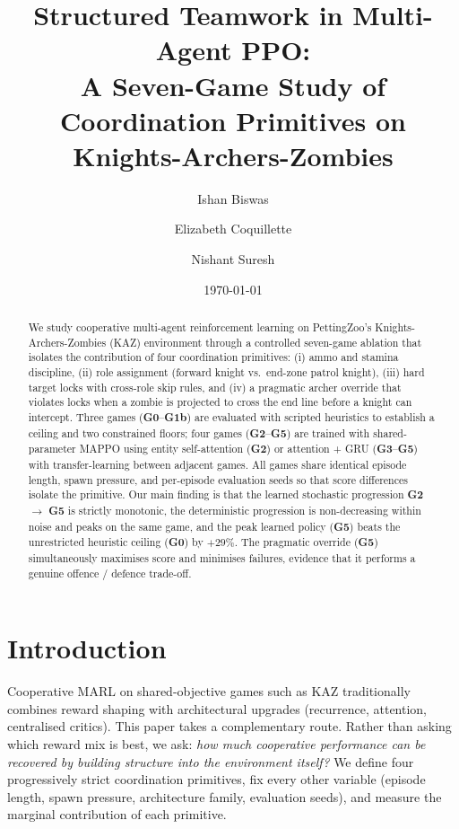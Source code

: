 \documentclass[11pt,a4paper]{article}
\newcommand{\gz}{\textbf{G0}}
\newcommand{\gb}{\textbf{G1b}}
\newcommand{\gii}{\textbf{G2}}
\newcommand{\giii}{\textbf{G3}}
\newcommand{\gv}{\textbf{G5}}
\begin{document}
\title{\textbf{Structured Teamwork in Multi-Agent PPO:\\
A Seven-Game Study of Coordination Primitives on Knights-Archers-Zombies}}
\author[1]{Ishan Biswas \and Elizabeth Coquillette \and Nishant Suresh}
\date{\today}
\maketitle

\begin{abstract}
We study cooperative multi-agent reinforcement learning on PettingZoo's
Knights-Archers-Zombies (KAZ) environment through a controlled
seven-game ablation that isolates the contribution of four coordination
primitives: (i) ammo and stamina discipline, (ii) role assignment
(forward knight vs.\ end-zone patrol knight), (iii) hard target locks
with cross-role skip rules, and (iv) a pragmatic archer override that
violates locks when a zombie is projected to cross the end line before a
knight can intercept. Three games (\gz--\gb{}) are evaluated with
scripted heuristics to establish a ceiling and two constrained floors;
four games (\gii--\gv{}) are trained with shared-parameter MAPPO using
entity self-attention (\gii{}) or attention + GRU (\giii--\gv{}) with
transfer-learning between adjacent games. All games share identical
episode length, spawn pressure, and per-episode evaluation seeds so that
score differences isolate the primitive. Our main finding is that the
learned stochastic progression \gii{} $\to$ \gv{} is strictly monotonic,
the deterministic progression is non-decreasing within noise and peaks
on the same game, and the peak learned policy (\gv{}) beats the
unrestricted heuristic ceiling (\gz{}) by \textbf{$+29\%$}. The pragmatic
override (\gv{}) simultaneously maximises score and minimises failures,
evidence that it performs a genuine offence / defence trade-off.
\end{abstract}

\section{Introduction}
\label{sec:intro}

Cooperative MARL on shared-objective games such as KAZ traditionally
combines reward shaping with architectural upgrades (recurrence,
attention, centralised critics). This paper takes a complementary route.
Rather than asking which reward mix is best, we ask: \emph{how much
cooperative performance can be recovered by building structure into the
environment itself?} We define four progressively strict coordination
primitives, fix every other variable (episode length, spawn pressure,
architecture family, evaluation seeds), and measure the marginal
contribution of each primitive.
\end{document}
